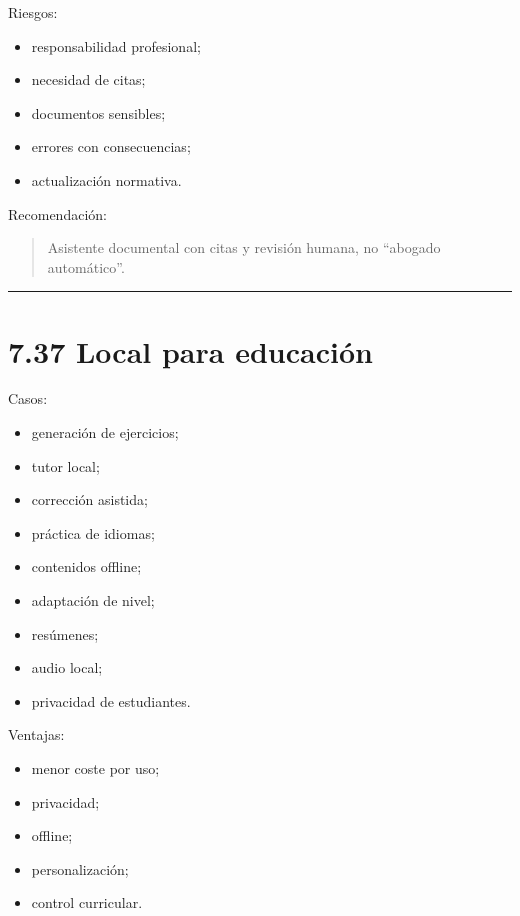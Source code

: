 Riesgos:

\begin{itemize}
\tightlist
\item
  responsabilidad profesional;
\item
  necesidad de citas;
\item
  documentos sensibles;
\item
  errores con consecuencias;
\item
  actualización normativa.
\end{itemize}

Recomendación:

\begin{quote}
Asistente documental con citas y revisión humana, no ``abogado
automático''.
\end{quote}

\begin{center}\rule{0.5\linewidth}{0.5pt}\end{center}

\section{7.37 Local para educación}\label{local-para-educaciuxf3n}

Casos:

\begin{itemize}
\tightlist
\item
  generación de ejercicios;
\item
  tutor local;
\item
  corrección asistida;
\item
  práctica de idiomas;
\item
  contenidos offline;
\item
  adaptación de nivel;
\item
  resúmenes;
\item
  audio local;
\item
  privacidad de estudiantes.
\end{itemize}

Ventajas:

\begin{itemize}
\tightlist
\item
  menor coste por uso;
\item
  privacidad;
\item
  offline;
\item
  personalización;
\item
  control curricular.
\end{itemize}

